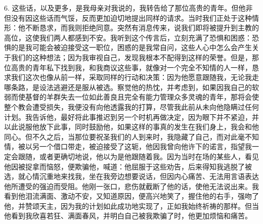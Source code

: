 6. 这些话，以及更多，是我母亲对我说的，我转告给了那位高贵的青年。但他非但没有因这些话而气馁，反而更加迫切地提出同样的请求。当时我们正处于这种情形：他不断恳求，而我则拒绝同意。突然有消息传来，说我们即将被提升到主教的高位，这使我们两人都感到不安。我听到这个传言后，立刻充满了恐惧和困惑：恐惧的是我可能会被迫接受这一职位，困惑的是我常自问，这些人心中怎么会产生关于我们的这种想法；因为我审视自己，发现我根本不配得到这样的荣誉。但是，那位高贵的青年私下找到我，和我商议这些事，就像对一个完全不知情的人一样，恳求我们这次也像从前一样，采取同样的行动和决策：因为他愿意跟随我，无论我走哪条路，是设法逃避还是服从被选。察觉他的热忱，并考虑到，如果因我自己的软弱而使基督的羊群失去一位如此善良且完全有能力管理众多灵魂的青年，那将会使整个教会遭受损失，我便没有向他透露我的打算，尽管我此前从未向他隐瞒过任何计划。我告诉他，最好将此事推迟到另一个时机再做决定，因为眼下并不紧迫，并以此说服他放下此事，同时鼓励他，如果这样的事真的发生在我们身上，我会和他同心。但不久之后，当那位要祝圣我们的人到来时，我隐藏了自己，而对此毫不知情，被以另一个借口带走，被迫接受了这轭，他因我曾向他许下的诺言，指望我一定会跟随，或者更确切地说，他以为是他跟随着我。因为当时在场的某些人，看见他因被捉拿而恼怒，便欺骗他，喊道：他屈服于这些劝告，后来得知我逃脱了被选，就心情沉重地来找我，坐在我旁边想要说话，但因内心痛苦、无法用言语表达他所遭受的强迫而受阻。他刚一张口，悲伤就截断了他的话，使他无法说出来。我看到他泪流满面、激动不安，又知道原因，便高兴地笑了，握住他的右手，强吻了他，并赞颂天主，因为我的计划如此成功地实现了，正如我始终祈祷的那样。但当他看到我欣喜若狂、满面春风，并明白自己被我欺骗了时，他更加烦恼和痛苦。\par

